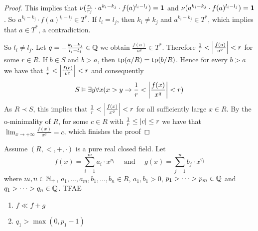 \documentclass[11pt]{article}
\begin{document}
\begin{proof}
This implies that \(\nu(\frac{r_i}{r_j}\cdot a^{k_i-k_j}\cdot f(a)^{l_i-l_j})=\operatorname{\textbf{1}}\)
and \(\nu(a^{k_i-k_j}\cdot f(a)^{l_i-l_j})=\operatorname{\textbf{1}}\). So \(a^{k_i-k_j}\cdot f(a)^{l_i-l_j}\in T^*\). If \(l_i=l_j\),
then \(k_i\neq k_j\) and \(a^{k_i-k_j}\in T^*\), which implies that \(a\in T^*\), a contradiction.

So \(l_i\neq l_j\). Let \(q=-\frac{k_i-k_j}{l_i-l_j}\in\mathbb{Q}\) we obtain \(\frac{f(a)}{a^q}\in T^*\).
Therefore \(\frac{1}{r}<\abs{\frac{f(a)}{a^q}}<r\) for some \(r\in R\). If \(b\in S\) and \(b>a\),
then \(\operatorname{tp}(a/R)=\operatorname{tp}(b/R)\). Hence for every \(b>a\) we have
that \(\frac{1}{r}<\abs{\frac{f(b)}{b^q}}<r\) and consequently
\begin{equation*}
S\vDash\exists y\forall x(x>y\to\frac{1}{r}<\abs{\frac{f(x)}{x^q}}<r)
\end{equation*}
As \(R\prec S\), this implies that \(\frac{1}{r}<\abs{\frac{f(x)}{x^q}}<r\) for all sufficiently
large \(x\in R\). By the o-minimality of \(R\), for some \(c\in R\) with \(\frac{1}{r}\le\abs{c}\le r\)
we have that \(\lim_{x\to+\infty}\frac{f(x)}{x^q}=c\), which finishes the proof
\end{proof}

\begin{theorem}[3.5.6]
\label{3.5.6}
Assume \((R,<,+,\cdot)\) is a pure real closed field. Let
\begin{equation*}
f(x)=\sum_{i=1}^ma_i\cdot x^{p_i}\quad\text{ and }\quad g(x)=\sum_{j=1}^nb_j\cdot x^{q_j}
\end{equation*}
where \(m,n\in\mathbb{N}_+\), \(a_1,\dots,a_m,b_1,\dots,b_n\in R\), \(a_1,b_1>0\), \(p_1>\dots>p_m\in\mathbb{Q}\) and \(q_1>\dots>q_n\in\mathbb{Q}\). TFAE
\begin{enumerate}
\item \(f\ll f+g\)
\item \(q_1>\max(0,p_1-1)\)
\end{enumerate}
\end{theorem}
\end{document}
